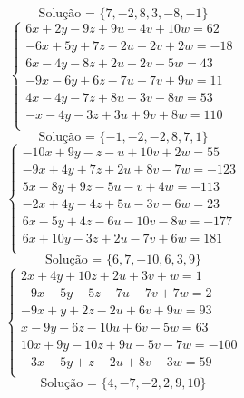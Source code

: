 \documentclass[12pt,oneside,a4paper]{article}
\begin{document}
\begin{equation*}
\text{Solução = }\{7,-2,8,3,-8,-1\}
\end{equation*}
\vspace{\baselineskip}
\begin{equation*}
\begin{cases}
6x+2y-9z+9u-4v+10w=62 \\
-6x+5y+7z-2u+2v+2w=-18 \\
6x-4y-8z+2u+2v-5w=43 \\
-9x-6y+6z-7u+7v+9w=11 \\
4x-4y-7z+8u-3v-8w=53 \\
-x-4y-3z+3u+9v+8w=110 \\
\end{cases}
\end{equation*}
\begin{equation*}
\text{Solução = }\{-1,-2,-2,8,7,1\}
\end{equation*}
\vspace{\baselineskip}
\begin{equation*}
\begin{cases}
-10x+9y-z-u+10v+2w=55 \\
-9x+4y+7z+2u+8v-7w=-123 \\
5x-8y+9z-5u-v+4w=-113 \\
-2x+4y-4z+5u-3v-6w=23 \\
6x-5y+4z-6u-10v-8w=-177 \\
6x+10y-3z+2u-7v+6w=181 \\
\end{cases}
\end{equation*}
\begin{equation*}
\text{Solução = }\{6,7,-10,6,3,9\}
\end{equation*}
\vspace{\baselineskip}
\begin{equation*}
\begin{cases}
2x+4y+10z+2u+3v+w=1 \\
-9x-5y-5z-7u-7v+7w=2 \\
-9x+y+2z-2u+6v+9w=93 \\
x-9y-6z-10u+6v-5w=63 \\
10x+9y-10z+9u-5v-7w=-100 \\
-3x-5y+z-2u+8v-3w=59 \\
\end{cases}
\end{equation*}
\begin{equation*}
\text{Solução = }\{4,-7,-2,2,9,10\}
\end{equation*}
\end{document}
